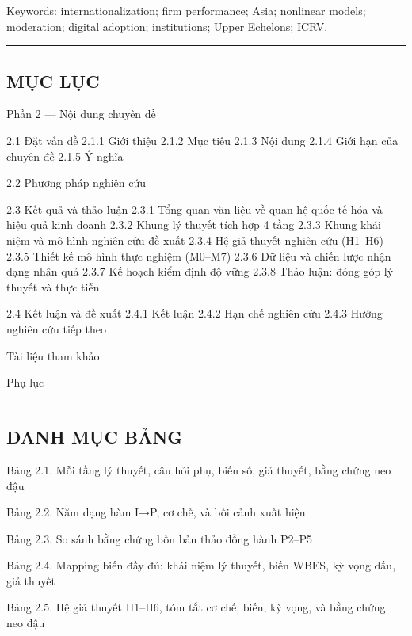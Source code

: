 \documentclass[12pt,a4paper]{article}
\begin{document}
Keywords: internationalization; firm performance; Asia; nonlinear
models; moderation; digital adoption; institutions; Upper Echelons;
ICRV.

\begin{center}\rule{0.5\linewidth}{0.5pt}\end{center}

\hypertarget{mux1ee5c-lux1ee5c}{%
\subsection{MỤC LỤC}\label{mux1ee5c-lux1ee5c}}

Phần 2 --- Nội dung chuyên đề

2.1 Đặt vấn đề 2.1.1 Giới thiệu 2.1.2 Mục tiêu 2.1.3 Nội dung 2.1.4 Giới
hạn của chuyên đề 2.1.5 Ý nghĩa

2.2 Phương pháp nghiên cứu

2.3 Kết quả và thảo luận 2.3.1 Tổng quan văn liệu về quan hệ quốc tế hóa
và hiệu quả kinh doanh 2.3.2 Khung lý thuyết tích hợp 4 tầng 2.3.3 Khung
khái niệm và mô hình nghiên cứu đề xuất 2.3.4 Hệ giả thuyết nghiên cứu
(H1--H6) 2.3.5 Thiết kế mô hình thực nghiệm (M0--M7) 2.3.6 Dữ liệu và
chiến lược nhận dạng nhân quả 2.3.7 Kế hoạch kiểm định độ vững 2.3.8
Thảo luận: đóng góp lý thuyết và thực tiễn

2.4 Kết luận và đề xuất 2.4.1 Kết luận 2.4.2 Hạn chế nghiên cứu 2.4.3
Hướng nghiên cứu tiếp theo

Tài liệu tham khảo

Phụ lục

\begin{center}\rule{0.5\linewidth}{0.5pt}\end{center}

\hypertarget{danh-mux1ee5c-bux1ea3ng}{%
\subsection{DANH MỤC BẢNG}\label{danh-mux1ee5c-bux1ea3ng}}

Bảng 2.1. Mỗi tầng lý thuyết, câu hỏi phụ, biến số, giả thuyết, bằng
chứng neo đậu

Bảng 2.2. Năm dạng hàm I→P, cơ chế, và bối cảnh xuất hiện

Bảng 2.3. So sánh bằng chứng bốn bản thảo đồng hành P2--P5

Bảng 2.4. Mapping biến đầy đủ: khái niệm lý thuyết, biến WBES, kỳ vọng
dấu, giả thuyết

Bảng 2.5. Hệ giả thuyết H1--H6, tóm tắt cơ chế, biến, kỳ vọng, và bằng
chứng neo đậu
\end{document}
